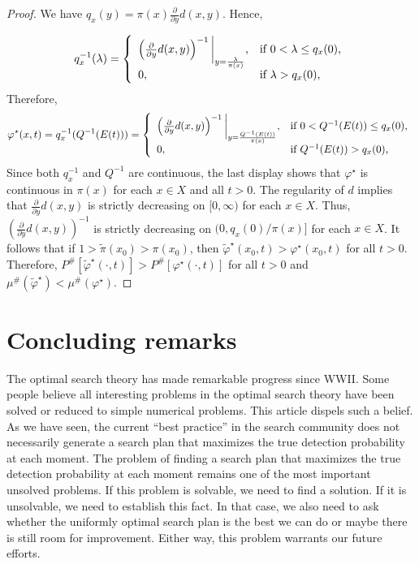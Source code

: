 \documentclass[12pt]{article}
\theoremstyle{plain}
\theoremstyle{definition}
\theoremstyle{remark}
\begin{document}
\begin{proof}
We have $q_x(y)=\pi(x)\frac{\partial }{\partial y}d(x, y)$.  Hence, 

\[
q^{-1}_x(\lambda)=\left\{
		                           \begin{array}{ll}
		                           \left(\frac{\partial }{\partial y}d(x, y)\right)^{-1}\bigg |_{y=\frac{\lambda}{\pi(x)}},& \hbox{if $0<\lambda\leq q_x(0)$,} \\
					0, & \hbox{if $\lambda>q_x(0)$,} 
		                          \end{array}
		                         \right.
\]
Therefore, 
\[
\varphi^\star(x, t)=q_x^{-1}(Q^{-1}(E(t)))=\left\{
		                           \begin{array}{ll}
		                           \left(\frac{\partial }{\partial y}d(x, y)\right)^{-1}\bigg |_{y=\frac{Q^{-1}(E(t))}{\pi(x)}},& \hbox{if $0<Q^{-1}(E(t)) \leq q_x(0)$,} \\
					0, & \hbox{if $Q^{-1}(E(t))>q_x(0)$,} 
		                          \end{array}
		                         \right.
\]
Since both $q_x^{-1}$ and $Q^{-1}$ are continuous,  the last display shows that $\varphi^\star$ is continuous in $\pi(x)$ for each $x\in X$ and all $t>0$. The regularity of $d$ implies that $\frac{\partial }{\partial y}d(x, y)$ is strictly decreasing on $[0, \infty)$ for each $x\in X$.  Thus,  $\left(\frac{\partial }{\partial y}d(x, y)\right)^{-1}$ is strictly decreasing on $(0, q_x(0)/\pi(x)]$ for each $x\in X$.  It follows that if $1>\widetilde{\pi}(x_0)>\pi(x_0)$, then $\widetilde{\varphi}^\star(x_0, t)>\varphi^\star(x_0, t)$ for all $t>0$.  Therefore,  $P^{\#}[\widetilde{\varphi}^\star(\cdot, t)]>P^{\#}[\varphi^\star(\cdot, t)]$ for all $t>0$ and $\mu^{\#}(\widetilde{\varphi}^\star)<\mu^{\#}(\varphi^\star)$.
\end{proof}






\section{Concluding remarks}

The optimal search theory has made remarkable progress since WWII.  Some people believe all interesting problems in the optimal search theory have been solved or reduced to simple numerical problems.  This article dispels such a belief.  As we have seen,  the current ``best practice'' in the search community does not necessarily generate a search plan that maximizes the true detection probability at each moment.  The problem of finding a search plan that maximizes the true detection probability at each moment remains one of the most important unsolved problems.  If this problem is solvable,   we need to find a solution.  If it is unsolvable,  we need to establish this fact.  In that case,  we also need to ask whether the uniformly optimal search plan is the best we can do or maybe there is still room for improvement. Either way,  this problem warrants our future efforts.
\end{document}
